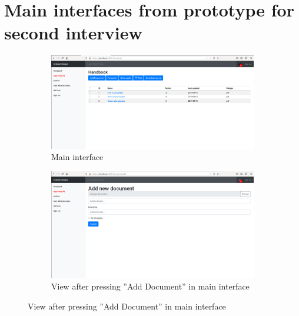 \section{Main interfaces from prototype for second interview}\label{sec:1prototype}
\begin{figure}[H]
	\centering
	\begin{subfigure}[b]{0.48\textwidth}
		\includegraphics[width=\textwidth]{billeder/iteration1Prototyper/Handbook.png}
		\caption{Main interface}
		\label{fig:3-main}
	\end{subfigure}
	\quad
	\begin{subfigure}[b]{0.48\textwidth}
		\includegraphics[width=\textwidth]{billeder/iteration1Prototyper/Add-Document.png}
		\caption{View after pressing ''Add Document'' in main interface}
		\label{fig:3-addDoc}
	\end{subfigure}
\end{figure}
